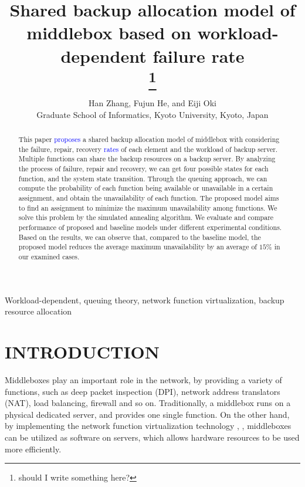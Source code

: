 \documentclass[conference]{IEEEtran}
\begin{document}
 
\title{Shared backup allocation model of middlebox based on workload-dependent failure rate \\

\thanks{should I write something here?}
}

\author{Han Zhang, Fujun He, and Eiji Oki\\
Graduate School of Informatics, Kyoto University, Kyoto, Japan}

\maketitle

\begin{abstract}
This paper \textcolor{blue}{proposes} a shared backup allocation model of middlebox with considering the failure, repair, recovery \textcolor{blue}{rates} of each element and the workload of backup server. Multiple functions can share the backup resources on a backup server. By analyzing the process of failure, repair and recovery, we can get four possible states for each function, and the system state transition. Through the queuing 
approach, we can compute the probability of each function being available or unavailable in a certain assignment, and obtain the unavailability of each function. The proposed model aims to find an assignment to minimize the maximum unavailability among functions. We solve this problem by the simulated annealing algorithm. We evaluate and compare performance of proposed and baseline models under different experimental conditions. Based on the results, we can observe that, compared to the baseline model, the proposed model reduces the average maximum unavailability by an average of $15\%$ in our examined cases.
\end{abstract}
\begin{IEEEkeywords}
Workload-dependent, queuing theory, network function virtualization, backup resource allocation
\end{IEEEkeywords}

\section{INTRODUCTION}
  
Middleboxes play an important role in the network, by providing a variety of functions, such as deep packet inspection (DPI), network address translators (NAT), load balancing, firewall and so on. Traditionally, a middlebox runs on a physical dedicated server, and provides one single function. On the other hand, by implementing the network function virtualization technology \cite{han2015network}, \cite{mijumbi2015network}, middleboxes can be utilized as software on servers, which allows hardware resources to be used more efficiently.
\end{document}
